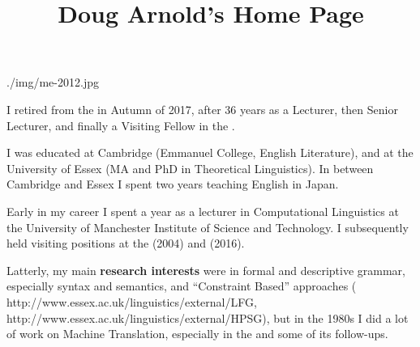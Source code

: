 \documentclass[a4paper]{article}
\title{%
        Doug Arnold's Home Page
      }
\date{}
\author{\MyEmail}
\begin{document}
\maketitle

      {./img/me-2012.jpg}

I retired from the  in Autumn of 2017,
after 36 years as a Lecturer, then Senior Lecturer, and finally a Visiting Fellow in the
.

I was educated at Cambridge (Emmanuel College, English Literature), and at the
University of Essex (MA and PhD in Theoretical Linguistics). In between Cambridge and Essex I spent two years teaching English
in Japan.

Early in my career I spent a year as a lecturer in Computational Linguistics at the University of
Manchester Institute of Science and Technology. I subsequently held visiting positions at the
 (2004)  and  (2016).

Latterly, my main \textbf{research interests} were in formal and descriptive grammar, especially
syntax and semantics, and 
``Constraint Based'' approaches 
(
          {http://www.essex.ac.uk/linguistics/external/LFG},
          {http://www.essex.ac.uk/linguistics/external/HPSG}), but in the 1980s I did a lot of
          work on Machine Translation, especially in the  and some of its follow-ups.


\end{document}
